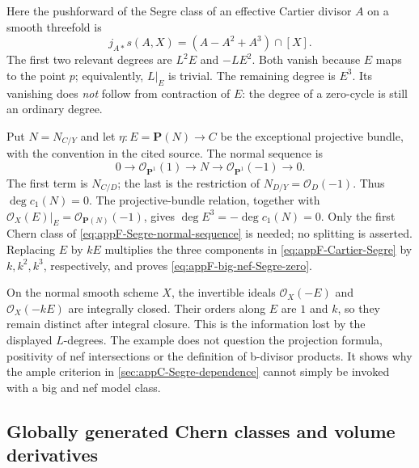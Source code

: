 Here the pushforward of the Segre class of an effective Cartier
divisor $A$ on a smooth threefold is
\[
 j_{A*}s(A,X)=(A-A^2+A^3)\cap[X].
\tag{F.19}\label{eq:appF-Cartier-Segre}
\]
The first two relevant degrees are $L^2E$ and $-LE^2$.
Both vanish because $E$ maps to the point $p$; equivalently,
$L|_E$ is trivial. The remaining degree is $E^3$.
Its vanishing does \emph{not} follow from contraction of $E$:
the degree of a zero-cycle is still an ordinary degree.

Put $N=N_{C/Y}$ and let $\eta:E=\mathbf P(N)\to C$ be
the exceptional projective bundle, with the convention in the
cited source. The normal sequence is
\[
 0\longrightarrow\mathcal O_{\mathbf P^1}(1)
 \longrightarrow N
 \longrightarrow\mathcal O_{\mathbf P^1}(-1)
 \longrightarrow0.
\tag{F.20}\label{eq:appF-Segre-normal-sequence}
\]
The first term is $N_{C/D}$; the last is the restriction of
$N_{D/Y}=\mathcal O_D(-1)$. Thus $\deg c_1(N)=0$.
The projective-bundle relation, together with
$\mathcal O_X(E)|_E=\mathcal O_{\mathbf P(N)}(-1)$, gives
$\deg E^3=-\deg c_1(N)=0$.
Only the first Chern class of \eqref{eq:appF-Segre-normal-sequence}
is needed; no splitting is asserted. Replacing $E$ by $kE$
multiplies the three components in
\eqref{eq:appF-Cartier-Segre} by $k,k^2,k^3$, respectively,
and proves \eqref{eq:appF-big-nef-Segre-zero}.

On the normal smooth scheme $X$, the invertible ideals
$\mathcal O_X(-E)$ and $\mathcal O_X(-kE)$ are integrally
closed. Their orders along $E$ are $1$ and $k$, so they remain
distinct after integral closure. This is the information lost
by the displayed $L$-degrees. The example does not question
the projection formula, positivity of nef intersections or the
definition of b-divisor products. It shows why the ample
criterion in \cref{sec:appC-Segre-dependence} cannot simply
be invoked with a big and nef model class.

\subsection{Globally generated Chern classes and volume derivatives}
\label{sec:appF-Chern-volume-bridge}

